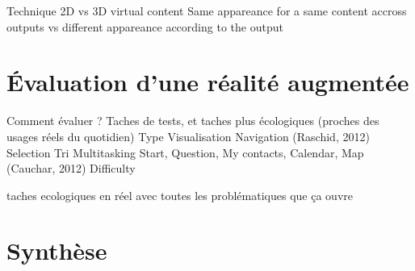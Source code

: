         Technique 
            2D vs 3D virtual content \cite{JansenDragicevicFekete2013} \cite{SerranoHildebrandtSubramanianEtAl2014}
            Same appareance for a same content accross outputs vs different appareance according to the output \cite{GrubertHeinischQuigleyEtAl2015} 



\section*{Évaluation d'une réalité augmentée}
Comment évaluer ? Taches de tests, et taches plus écologiques (proches des usages réels du quotidien) \cite{DuenserGrassetBillinghurst2008} \cite{DeSaChurchill2013}
    Type
        Visualisation 
        Navigation \cite{EnsFinneganIrani2014} (Raschid, 2012) 
        Selection \cite{EnsFinneganIrani2014}
        Tri \cite{RobertsonCzerwinskiLarsonEtAl1998}
        Multitasking 
            Start, Question, My contacts, Calendar, Map (Cauchar, 2012) \cite{EnsFinneganIrani2014} 
    Difficulty

    taches ecologiques en réel avec toutes les problématiques que ça ouvre \cite{KoelleKranzMoeller2015} \cite{DenningDehlawiKohno2014}



\section*{Synthèse}
